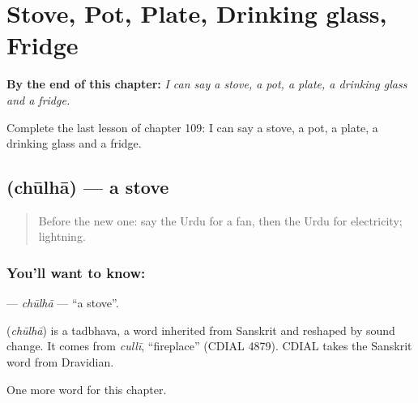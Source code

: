 
\chapter{Stove, Pot, Plate, Drinking glass, Fridge}
\label{ch:ur-stove-pot-plate-drinking-glass-fridge}

\begin{chapteropening}
\textbf{By the end of this chapter:} \emph{I can say a stove, a pot, a plate, a drinking glass and a fridge.}

Complete the last lesson of chapter 109: I can say a stove, a pot, a plate, a drinking glass and a fridge.
\end{chapteropening}

\section[\texorpdfstring{\ur{چولہا} (chūlhā)}{چولہا (chūlhā)}]{ (chūlhā) — a stove}

\label{lesson:UR-C109-chulha}



\begin{quote}
Before the new one: say the Urdu for a fan, then the Urdu for electricity; lightning.
\end{quote}

\subsection*{You'll want to know: }
\textbf{} — \emph{chūlhā} — \textquotedblleft{}a stove\textquotedblright{}.

\begin{cousinweb}
\textbf{} (\emph{chūlhā}) is a tadbhava, a word inherited from Sanskrit and reshaped by sound change. It comes from \emph{cullī}, \textquotedblleft{}fireplace\textquotedblright{} (CDIAL 4879). CDIAL takes the Sanskrit word from Dravidian.
\end{cousinweb}

\begin{grammarlens}[title={What you've built}]
One more word for this chapter.
\end{grammarlens}

